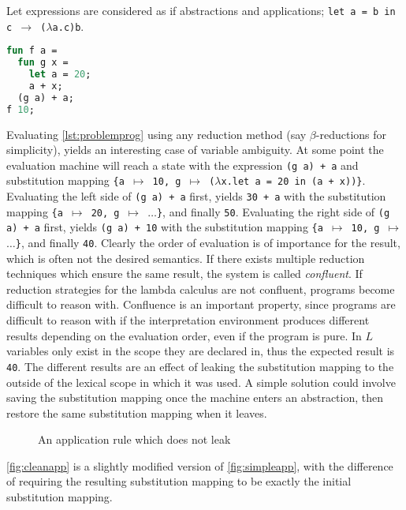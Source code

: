 \documentclass[11pt,oneside,a4paper]{report}
\begin{document}
Let expressions are considered as if abstractions and applications; \texttt{let a = b in c $\rightarrow$ ($\lambda$a.c)b}.
\begin{lstlisting}[language=ML,caption={Problematic program},label={lst:problemprog},mathescape=true]
fun f a = 
  fun g x = 
    let a = 20;
    a + x;
  (g a) + a;
f 10;
\end{lstlisting}
Evaluating \autoref{lst:problemprog} using any reduction method (say $\beta$-reductions for simplicity), yields an interesting case of variable ambiguity.
At some point the evaluation machine will reach a state with the expression \texttt{(g a) + a} and substitution mapping \texttt{\{a $\mapsto$ 10, g $\mapsto$ ($\lambda$x.let a = 20 in (a + x))\}}.
Evaluating the left side of \texttt{(g a) + a} first, yields \texttt{30 + a} with the substitution mapping \texttt{\{a $\mapsto$ 20, g $\mapsto$ $\dots$\}}, and finally \texttt{50}.
Evaluating the right side of \texttt{(g a) + a} first, yields \texttt{(g a) + 10} with the substitution mapping \texttt{\{a $\mapsto$ 10, g $\mapsto$ $\dots$\}}, and finally \texttt{40}.
Clearly the order of evaluation is of importance for the result, which is often not the desired semantics.
If there exists multiple reduction techniques which ensure the same result, the system is called \textit{confluent}.
If reduction strategies for the lambda calculus are not confluent, programs become difficult to reason with.
Confluence is an important property, since programs are difficult to reason with if the interpretation environment produces different results depending on the evaluation order, even if the program is pure.
In $L$ variables only exist in the scope they are declared in, thus the expected result is \texttt{40}.
The different results are an effect of leaking the substitution mapping to the outside of the lexical scope in which it was used.
A simple solution could involve saving the substitution mapping once the machine enters an abstraction, then restore the same substitution mapping when it leaves.
\begin{figure}[ht]
    \begin{mdframed}[style=style1]
        \vspace*{0.4cm}
          \begin{prooftree}
          \end{prooftree}   
    \end{mdframed}
    \caption{An application rule which does not leak}
    \label{fig:cleanapp}
\end{figure}
\noindent \autoref{fig:cleanapp} is a slightly modified version of \autoref{fig:simpleapp}, with the difference of requiring the resulting substitution mapping to be exactly the initial substitution mapping.
\end{document}
